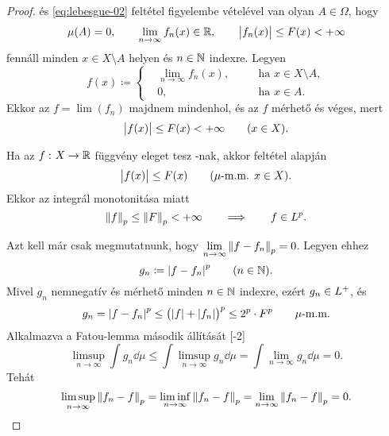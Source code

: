 \documentclass[
]{elteikthesis}[2024/04/26]
\begin{document}
	\begin{proof}
		 és \ref{eq:lebesgue-02} feltétel figyelembe vételével
		van olyan \( A \in \Omega \), hogy
		\[
			\mu(A) = 0, \qquad
			\lim_{n \to \infty} f_n(x) \in \mathbb{R}, \qquad
			\abs\big{ f_n(x) } \leq F(x) < +\infty
		\]
		fennáll minden \( x \in X \setminus A \) helyen és \( n \in \mathbb{N} \) indexre. 
		Legyen
		\[
			f(x) \coloneq 
			\left\{
			\begin{alignedat}{2}
				&\lim_{n \to \infty} f_n(x), \quad && \text{ha } x \in X \setminus A, \\[3pt]
				&0,                          \quad && \text{ha } x \in A.
			\end{alignedat}
			\right.
		\]
		Ekkor az \( f = \lim(f_n) \) majdnem mindenhol, és az \( f \) mérhető és véges, mert
		\[
			\abs\big{f(x)} \leq F(x) < +\infty \qquad (x \in X).
		\]
		
		Ha az \( f \,\colon X \to \mathbb{R} \) függvény eleget tesz -nak,
		akkor  feltétel alapján
		\[
			\abs\big{f(x)} \leq F(x) \qquad (\mu \text{-m.m. } x \in X).
		\]
		Ekkor az integrál monotonitása miatt
		\[
			\norm{f}_p \leq \norm{F}_p < +\infty
			\qquad \Longrightarrow \qquad
			f \in \Lebesgue[p].
		\]
		
		Azt kell már csak megmutatnunk, 
		hogy \( \lim\limits_{n \to \infty} \norm{f - f_n}_p = 0\). Legyen ehhez
		\[
			g_n \coloneq \abs{f - f_n}^p \qquad (n \in \mathbb{N}).
		\]
		Mivel \( g_n \) nemnegatív és mérhető minden \( n \in \mathbb{N} \) indexre, 
		ezért \( g_n \in L^+ \), és
		\[
			g_n = 
			\abs{f - f_n}^p \leq
			\bigl( \abs{f} + \abs{f_n} \bigr)^p \leq
			2^p \cdot F^p
			\qquad \mu \text{-m.m.}
		\]
		\newpage
		Alkalmazva a Fatou-lemma második állítását
		[-2\baselineskip]
		\[
			\limsup_{n \to \infty} \int g_n \dd{\mu} \leq
			\int \limsup_{n \to \infty} g_n \dd{\mu} =
			\int \lim_{n \to \infty} g_n \dd{\mu} = 0.
		\]
		Tehát
		\[
			\limsup_{n \to \infty} \norm{f_n - f}_p = 
			\liminf_{n \to \infty} \norm{f_n - f}_p = 
			\lim_{n \to \infty} \norm{f_n - f}_p = 0.
		\]
	\end{proof}
	
\end{document}
